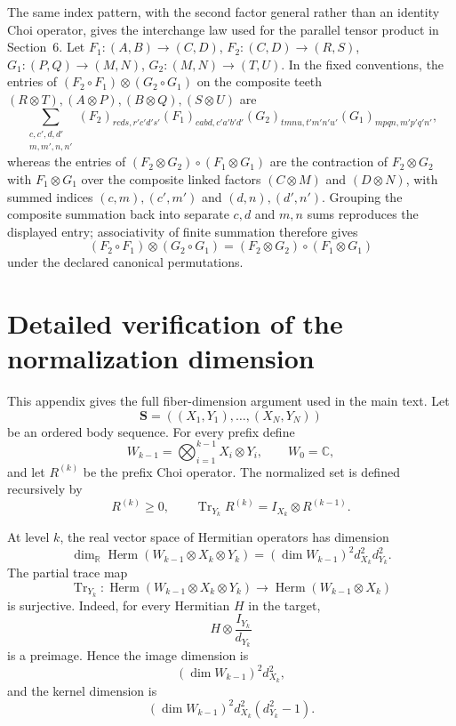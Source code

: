 \documentclass[11pt,a4paper]{article}
\theoremstyle{definition}
\theoremstyle{plain}
\theoremstyle{remark}
\DeclareMathOperator{\Tr}{Tr}
\DeclareMathOperator{\Herm}{Herm}
\begin{document}
The same index pattern, with the second factor general rather than an
identity Choi operator, gives the interchange law used for the parallel
tensor product in Section~6. Let $F_1:(A,B)\to(C,D)$,
$F_2:(C,D)\to(R,S)$, $G_1:(P,Q)\to(M,N)$, $G_2:(M,N)\to(T,U)$. In the
fixed conventions, the entries of $(F_2\circ F_1)\otimes(G_2\circ G_1)$
on the composite teeth $(R\otimes T),(A\otimes P),(B\otimes
Q),(S\otimes U)$ are
\[
\sum_{\substack{c,c',d,d'\\m,m',n,n'}}
(F_2)_{rcds,r'c'd's'}(F_1)_{cabd,c'a'b'd'}
(G_2)_{tmnu,t'm'n'u'}(G_1)_{mpqn,m'p'q'n'},
\]
whereas the entries of $(F_2\otimes G_2)\circ(F_1\otimes G_1)$ are the
contraction of $F_2\otimes G_2$ with $F_1\otimes G_1$ over the
composite linked factors $(C\otimes M)$ and $(D\otimes N)$, with summed
indices $(c,m),(c',m')$ and $(d,n),(d',n')$. Grouping the composite
summation back into separate $c,d$ and $m,n$ sums reproduces the
displayed entry; associativity of finite summation therefore gives
\[
(F_2\circ F_1)\otimes(G_2\circ G_1)
=
(F_2\otimes G_2)\circ(F_1\otimes G_1)
\]
under the declared canonical permutations.

\section{Detailed verification of the normalization dimension}
\label{app:dimension}

This appendix gives the full fiber-dimension argument used in the main
text. Let
\[
\mathbf S=((X_1,Y_1),\ldots,(X_N,Y_N))
\]
be an ordered body sequence. For every prefix define
\[
W_{k-1}=\bigotimes_{i=1}^{k-1}X_i\otimes Y_i,
\qquad W_0=\mathbb C,
\]
and let $R^{(k)}$ be the prefix Choi operator. The normalized set is
defined recursively by
\[
R^{(k)}\geq0,
\qquad
\Tr_{Y_k}R^{(k)}=I_{X_k}\otimes R^{(k-1)}.
\]

At level $k$, the real vector space of Hermitian operators has dimension
\[
\dim_{\mathbb R}\Herm(W_{k-1}\otimes X_k\otimes Y_k)
=(\dim W_{k-1})^2d_{X_k}^2d_{Y_k}^2.
\]
The partial trace map
\[
\Tr_{Y_k}:\Herm(W_{k-1}\otimes X_k\otimes Y_k)
\to\Herm(W_{k-1}\otimes X_k)
\]
is surjective. Indeed, for every Hermitian $H$ in the target,
\[
H\otimes\frac{I_{Y_k}}{d_{Y_k}}
\]
is a preimage. Hence the image dimension is
\[
(\dim W_{k-1})^2d_{X_k}^2,
\]
and the kernel dimension is
\[
(\dim W_{k-1})^2d_{X_k}^2(d_{Y_k}^2-1).
\]
\end{document}
